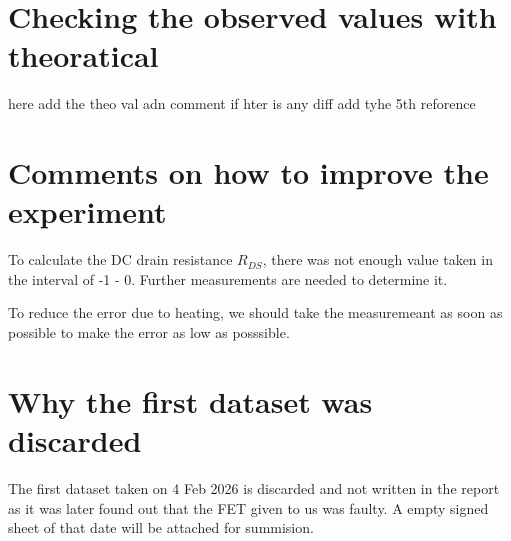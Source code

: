 \documentclass[%
sor,
 jor,
 amsmath,amssymb,
 reprint,
]{revtex4-2}
\begin{document}
\section{Checking the observed values with theoratical}
here add the theo val adn comment if hter is any diff add tyhe 5th reforence

\section{Comments on how to improve the experiment}
To calculate the DC drain resistance $R_{DS}$, there was not enough value taken in the interval of -1 - 0. Further measurements are needed to determine it. 

To reduce the error due to heating, we should take the measuremeant as soon as possible to make the error as low as posssible.


\section{Why the first dataset was discarded}
The first dataset taken on 4 Feb 2026 is discarded and not written in the report as it was later found out that the FET given to us was faulty. A empty signed sheet of that date will be attached for summision.



\end{document}
